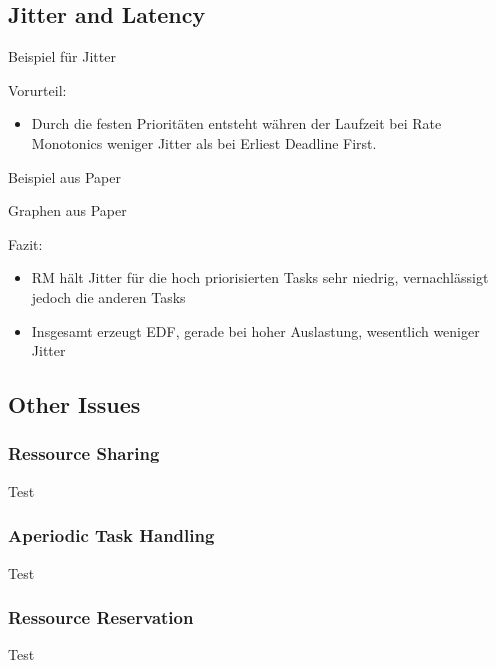 

\subsection{Jitter and Latency}

\begin{frame}{\subsecname}
	Beispiel für Jitter
\end{frame}

\begin{frame}{\subsecname}
	Vorurteil:
	\begin{itemize}
		\item Durch die festen Prioritäten entsteht währen der Laufzeit bei Rate Monotonics weniger Jitter als bei Erliest Deadline First. 
	\end{itemize}
\end{frame}

\begin{frame}{\subsecname}
	Beispiel aus Paper
\end{frame}

\begin{frame}{\subsecname}
	Graphen aus Paper
\end{frame}

\begin{frame}{\subsecname}
	Fazit:
	\begin{itemize}
		\item RM hält Jitter für die hoch priorisierten Tasks sehr niedrig, vernachlässigt jedoch die anderen Tasks
		\item Insgesamt erzeugt EDF, gerade bei hoher Auslastung, wesentlich weniger Jitter
	\end{itemize}
\end{frame}

\subsection{Other Issues}
\subsubsection{Ressource Sharing}
\begin{frame}{\subsubsecname}
	Test
\end{frame}

\subsubsection{Aperiodic Task Handling}
\begin{frame}{\subsubsecname}
	Test
\end{frame}

\subsubsection{Ressource Reservation}
\begin{frame}{\subsubsecname}
	Test
\end{frame}